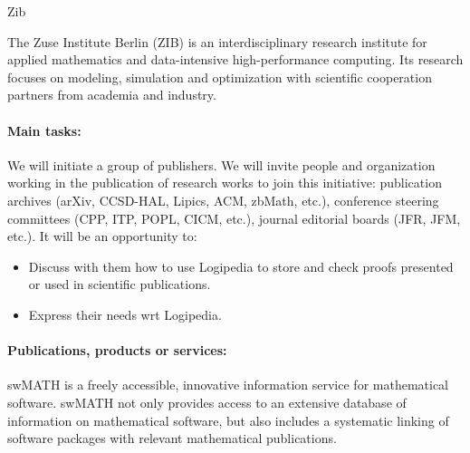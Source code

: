 \begin{sitedescription}{Zib}



The Zuse Institute Berlin (ZIB) is an interdisciplinary research institute for 
applied mathematics and data-intensive high-performance computing. 
Its research focuses on modeling, simulation and optimization with scientific 
cooperation partners from academia and industry.

\paragraph{Main tasks:}


	We will initiate a group of publishers. We will invite
	people and organization working in the publication of research
	works to join this initiative: publication archives (arXiv, CCSD-HAL,
	Lipics, ACM, zbMath, etc.), conference steering committees (CPP,
	ITP, POPL, CICM, etc.), journal editorial boards (JFR, JFM,
	etc.). It will be an opportunity to:
	
	\begin{itemize}
		\item Discuss with them how to use Logipedia to store and check proofs presented or used in scientific publications.
		\item Express their needs wrt Logipedia.
	\end{itemize}

 


\paragraph{Publications, products or services:}


\begin{compactitem}
\item swMATH is a freely accessible, innovative information service for mathematical software. 
                           swMATH not only provides access to an extensive database of information on mathematical software, 
                           but also includes a systematic linking of software packages with relevant mathematical publications.
\end{compactitem}


\end{sitedescription}
